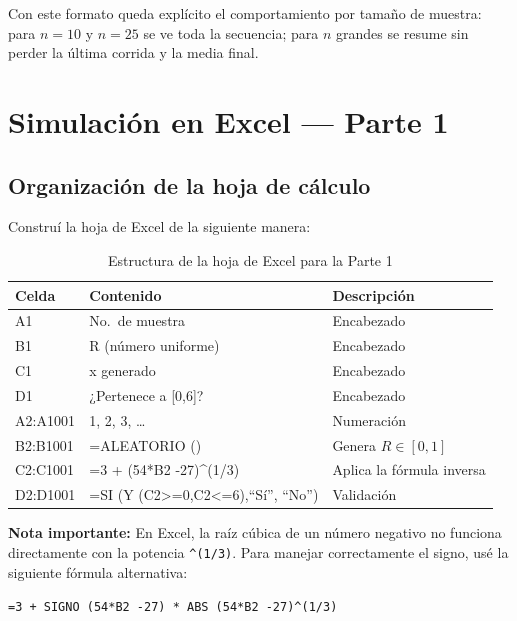 \documentclass[12pt,a4paper]{article}
\begin{document}
\begin{notabox}
Con este formato queda explícito el comportamiento por tamaño de muestra: para $n=10$ y $n=25$ se ve toda la secuencia; para $n$ grandes se resume sin perder la última corrida y la media final.
\end{notabox}

\newpage

\section{Simulación en Excel — Parte 1}

\subsection{Organización de la hoja de cálculo}

Construí la hoja de Excel de la siguiente manera:

\begin{table}[H]
\centering
\caption{Estructura de la hoja de Excel para la Parte 1}
\begin{tabular}{>{\ttfamily}l l l}
\toprule
\textbf{Celda} & \textbf{Contenido} & \textbf{Descripción} \\
\midrule
A1 & \textrm{No.\ de muestra} & Encabezado \\
B1 & \textrm{R (número uniforme)} & Encabezado \\
C1 & \textrm{x generado} & Encabezado \\
D1 & \textrm{¿Pertenece a [0,6]?} & Encabezado \\
\midrule
A2:A1001 & 1, 2, 3, \ldots & Numeración \\
B2:B1001 & \textrm{=ALEATORIO ()} & Genera $R \in [0,1]$ \\
C2:C1001 & \textrm{=3 + (54*B2 -27)\textasciicircum{}(1/3)} & Aplica la fórmula inversa \\
D2:D1001 & \textrm{=SI (Y (C2>=0,C2<=6),``Sí'', ``No'')} & Validación \\
\bottomrule
\end{tabular}
\end{table}

\textbf{Nota importante:} En Excel, la raíz cúbica de un número negativo no funciona directamente con la potencia \texttt{\^{}(1/3)}. Para manejar correctamente el signo, usé la siguiente fórmula alternativa:

\medskip
\noindent\texttt{=3 + SIGNO (54*B2 -27) * ABS (54*B2 -27)\textasciicircum(1/3)}
\medskip
\end{document}
